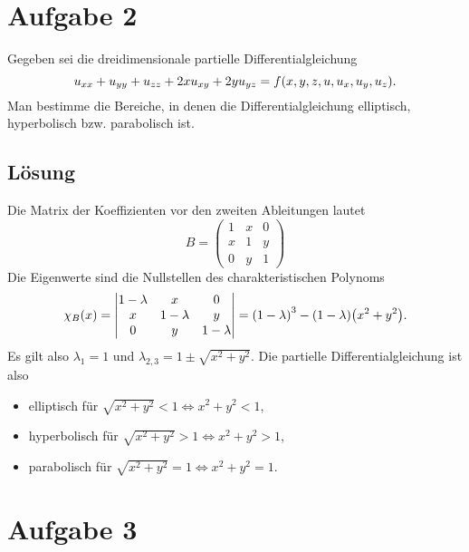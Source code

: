 \documentclass{exercise}
\begin{document}
    \section*{Aufgabe 2}

    \begin{problem}
        Gegeben sei die dreidimensionale partielle Differentialgleichung
        \[
            u_{xx} + u_{yy} + u_{zz} + 2xu_{xy} + 2yu_{yz} = f\parentheses*{x, y, z, u, u_x, u_y, u_z}.
        \]
        Man bestimme die Bereiche, in denen die Differentialgleichung elliptisch, hyperbolisch bzw. parabolisch ist.
    \end{problem}

    \subsection*{Lösung}
    Die Matrix der Koeffizienten vor den zweiten Ableitungen lautet
    \[
        B = \begin{pmatrix}
            1 & x & 0\\
            x & 1 & y\\
            0 & y & 1
        \end{pmatrix}
    \]
    Die Eigenwerte sind die Nullstellen des charakteristischen Polynoms
    \[
        \chi_B\parentheses*{x} = \begin{vmatrix}
            1 - \lambda & x & 0\\
            x & 1 - \lambda & y\\
            0 & y & 1 - \lambda
        \end{vmatrix} = \parentheses*{1 - \lambda}^3 - \parentheses*{1 - \lambda}\parentheses*{x^2 + y^2}.
    \]
    Es gilt also \(\lambda_1 = 1\) und \(\lambda_{2, 3} = 1 \pm \sqrt{x^2 + y^2}\).
    Die partielle Differentialgleichung ist also
    \begin{itemize}
        \item elliptisch für \(\sqrt{x^2 + y^2} < 1 \iff x^2 + y^2 < 1\),
        \item hyperbolisch für \(\sqrt{x^2 + y^2} > 1 \iff x^2 + y^2 > 1\),
        \item parabolisch für \(\sqrt{x^2 + y^2} = 1 \iff x^2 + y^2 = 1\).
    \end{itemize}


    \section*{Aufgabe 3}
\end{document}
